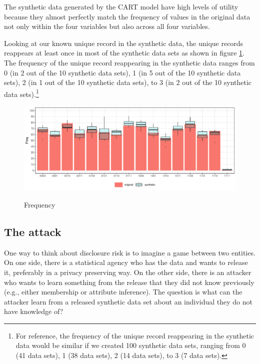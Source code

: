 \documentclass[a4paper,11pt]{style/uneceart}
\begin{document}
The synthetic data generated by the CART model have high levels of utility because they almost perfectly match the frequency of values in the original data not only within the four variables but also across all four variables. %

Looking at our known unique record in the synthetic data, the unique records reappears at least once in most of the synthetic data sets as shown in figure \ref{fig:cart_histogram_compare_10}.  The frequency of the unique record reappearing in the synthetic data ranges from 0 (in 2 out of the 10 synthetic data sets), 1 (in 5 out of the 10 synthetic data sets), 2 (in 1 out of the 10 synthetic data sets), to 3 (in 2 out of the 10 synthetic data sets).\footnote{For reference, the frequency of the unique record reappearing in the synthetic data would be similar if we created 100 synthetic data sets, ranging from 0 (41 data sets), 1 (38 data sets), 2 (14 data sets), to 3 (7 data sets).}  %

\begin{figure}[!h]
    \centering
    \caption{Frequency}
    \includegraphics[width=\textwidth]{../../graphs/graph_cart_histogram_compare_10_v1.pdf}
    \label{fig:cart_histogram_compare_10}
\end{figure}


\subsection{The attack}

One way to think about disclosure risk is to imagine a game between two entities.  On one side, there is a statistical agency who has the data and wants to release it, preferably in a privacy preserving way.  On the other side, there is an attacker who wants to learn something from the release that they did not know previously (e.g., either membership or attribute inference). The question is what can the attacker learn from a released synthetic data set about an individual they do not have knowledge of?
\end{document}
